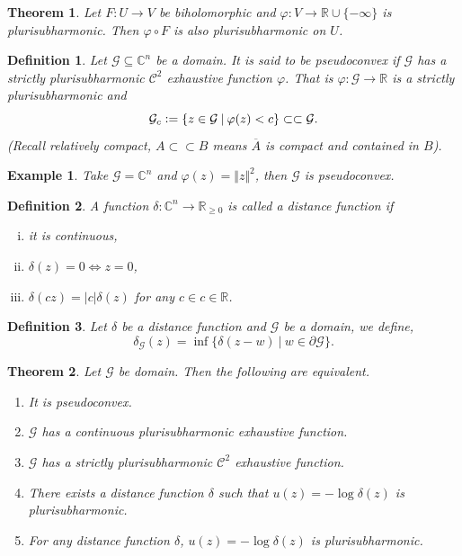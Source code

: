 \documentclass{article}
\newtheorem{theorem}{Theorem} [section]
\newtheorem{definition}{Definition}[section]
\newtheorem{example}{Example}[section]
\newcommand{\defeq}{\vcentcolon=}
\newcommand{\norm}[1]{\Vert #1 \Vert}
\newcommand{\R}[0]{\mathbb{R}}
\newcommand{\C}[0]{\mathbb{C}}
\newcommand{\G}[0]{\mathcal{G}}
\newcommand{\sep}[0]{\:|\:}
\newcommand{\bd}[0]{\partial}
\begin{document}
\begin{theorem}
  Let $F:U\to V$ be biholomorphic and $\varphi:V\to\R\cup\{-\infty\}$ is plurisubharmonic. Then $\varphi\circ F$ is also plurisubharmonic on $U$.
\end{theorem}

\begin{definition}
  Let $\G\subseteq\C^n$ be a domain. It is said to be pseudoconvex if $\G$ has a strictly plurisubharmonic $\mathcal{C}^2$ exhaustive function $\varphi$. That is $\varphi:\G\to\R$ is a strictly plurisubharmonic and 
  \begin{equation*}
    \G_c \defeq \{z\in\G\sep \varphi(z)<c\}\subset\subset \G.
  \end{equation*}
  (Recall relatively compact, $A\subset\subset B$ means $\overline{A}$ is compact and contained in $B$).
\end{definition}

\begin{example}
  Take $\G=\C^n$ and $\varphi(z) = \norm{z}^2$, then $\G$ is pseudoconvex.
\end{example}

\begin{definition}
  A function $\delta:\C^n\to\R_{\geq0}$ is called a distance function if 
  \begin{enumerate}[i).]
    \item it is continuous,
    \item $\delta(z) = 0\Leftrightarrow z=0$,
    \item $\delta(cz) = \vert c\vert \delta(z)$ for any $c\in c\in\R$.
  \end{enumerate}
\end{definition}

\begin{definition}
  Let $\delta$ be a distance function and $\G$ be a domain, we define,
  \begin{equation*}
    \delta_\G(z) = \inf\{\delta(z-w)\sep w\in\bd\G\}.
  \end{equation*}
\end{definition}

\begin{theorem}
  Let $\G$ be domain. Then the following are equivalent.
  \begin{enumerate}[1).]
    \item It is pseudoconvex.
    \item $\G$ has a continuous plurisubharmonic exhaustive function.
    \item $\G$ has a strictly plurisubharmonic $\mathcal{C}^2$ exhaustive function.
    \item There exists a distance function $\delta$ such that $u(z) = -\log\delta(z)$ is plurisubharmonic.
    \item For any distance function $\delta$, $u(z) = -\log\delta(z)$ is plurisubharmonic.
  \end{enumerate}
  \label{theorem_pseudo_convex_equiv}
\end{theorem}
\end{document}
